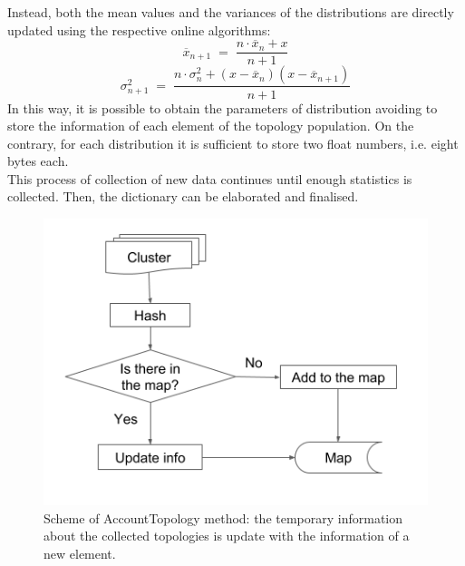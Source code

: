 Instead, both the mean values and the variances of the distributions are directly updated using the respective online algorithms:
\begin{equation}
 \overline{x}_{n + 1} \; = \; \frac{n \cdot \overline{x}_n + x}{n + 1}
\end{equation}
\begin{equation}
 \sigma^2_{n + 1} \; = \; \frac{n \cdot \sigma^2_n + (x - \overline{x}_n)(x - \overline{x}_{n + 1})}{n + 1}
\end{equation}
In this way, it is possible to obtain the parameters of distribution avoiding to store the information of each element of the topology population. On the contrary, for each distribution it is sufficient to store two float numbers, i.e. eight bytes each.\\
This process of collection of new data continues until enough statistics is collected. Then, the dictionary can be elaborated and finalised.\\
%
\begin{figure}
  \centering
  \includegraphics[scale=0.6]{figures/account.png}
  \caption{Scheme of AccountTopology method: the temporary information about the collected topologies is update with the information of a new element.}
  \label{fig:account}
\end{figure}
%

